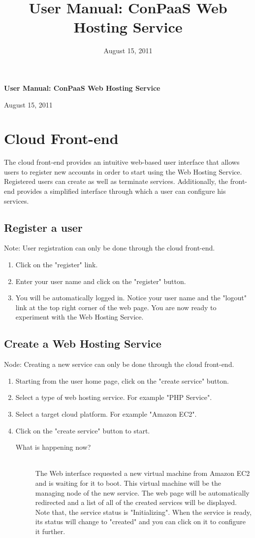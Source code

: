 \documentclass[12pt]{article}
\newenvironment{what}
{\begin{description} \item [What is happening now?] \hfill \\}
{\end{description}}
\begin{document}
\title{User Manual: ConPaaS Web Hosting Service}
\date{August 15, 2011}
\thispagestyle{empty}

\begin{center}
\begingroup
\fontsize{20pt}{20pt}\selectfont
\textbf{User Manual: ConPaaS Web Hosting Service} \linebreak
\endgroup

\begingroup
\fontsize{16pt}{16pt}\selectfont
August 15, 2011
\endgroup
\end{center}

\section{Cloud Front-end}
The cloud front-end provides an intuitive web-based user interface that
allows users to register new accounts in order to start using the Web
Hosting Service. Registered users can create as well as terminate
services. Additionally, the front-end provides a simplified interface
through which a user can configure his services.

\subsection{Register a user}
Note: User registration can only be done through the cloud front-end.
\begin{enumerate}
\item Click on the "register" link.
\item Enter your user name and click on the "register" button.
\item You will be automatically logged in. Notice your user name and the "logout"
      link at the top right corner of the web page. You are now ready to
      experiment with the Web Hosting Service.
\end{enumerate}

\subsection{Create a Web Hosting Service}
Node: Creating a new service can only be done through the cloud front-end. 
\begin{enumerate}
\item Starting from the user home page, click on the "create service" button.
\item Select a type of web hosting service. For example "PHP Service".
\item Select a target cloud platform. For example "Amazon EC2".
\item Click on the "create service" button to start.
 \begin{what}
  The Web interface requested a new virtual machine from Amazon EC2 and
  is waiting for it to boot. This virtual machine will be the managing
  node of the new service. The web page will be automatically redirected
  and a list of all of the created services will be displayed.
  Note that, the service status is "Initializing". When the service is
  ready, its status will change to "created" and you can click on it to
  configure it further.
 \end{what}
\end{enumerate}
\end{document}
